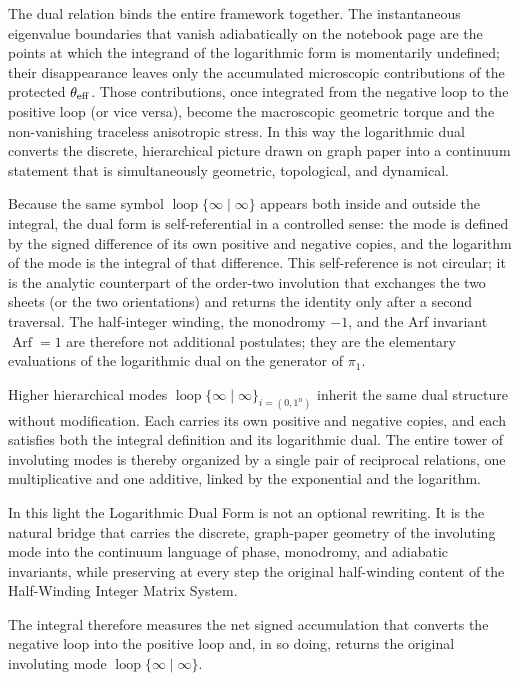 The dual relation binds the entire framework together. The instantaneous eigenvalue boundaries that vanish adiabatically on the notebook page are the points at which the integrand of the logarithmic form is momentarily undefined; their disappearance leaves only the accumulated microscopic contributions of the protected \(\theta_{\rm eff}\). Those contributions, once integrated from the negative loop to the positive loop (or vice versa), become the macroscopic geometric torque and the non-vanishing traceless anisotropic stress. In this way the logarithmic dual converts the discrete, hierarchical picture drawn on graph paper into a continuum statement that is simultaneously geometric, topological, and dynamical.

Because the same symbol \(\operatorname{loop}\{\infty\mid\infty\}\) appears both inside and outside the integral, the dual form is self-referential in a controlled sense: the mode is defined by the signed difference of its own positive and negative copies, and the logarithm of the mode is the integral of that difference. This self-reference is not circular; it is the analytic counterpart of the order-two involution that exchanges the two sheets (or the two orientations) and returns the identity only after a second traversal. The half-integer winding, the monodromy \(-1\), and the Arf invariant \(\operatorname{Arf}=1\) are therefore not additional postulates; they are the elementary evaluations of the logarithmic dual on the generator of \(\pi_1\).

Higher hierarchical modes \(\operatorname{loop}\{\infty\mid\infty\}_{i=(0,1^n)}\) inherit the same dual structure without modification. Each carries its own positive and negative copies, and each satisfies both the integral definition and its logarithmic dual. The entire tower of involuting modes is thereby organized by a single pair of reciprocal relations, one multiplicative and one additive, linked by the exponential and the logarithm.

In this light the Logarithmic Dual Form is not an optional rewriting. It is the natural bridge that carries the discrete, graph-paper geometry of the involuting mode into the continuum language of phase, monodromy, and adiabatic invariants, while preserving at every step the original half-winding content of the Half-Winding Integer Matrix System.

The integral therefore measures the net signed accumulation that converts the negative loop into the positive loop and, in so doing, returns the original involuting mode \(\operatorname{loop}\{\infty\mid\infty\}\).  

